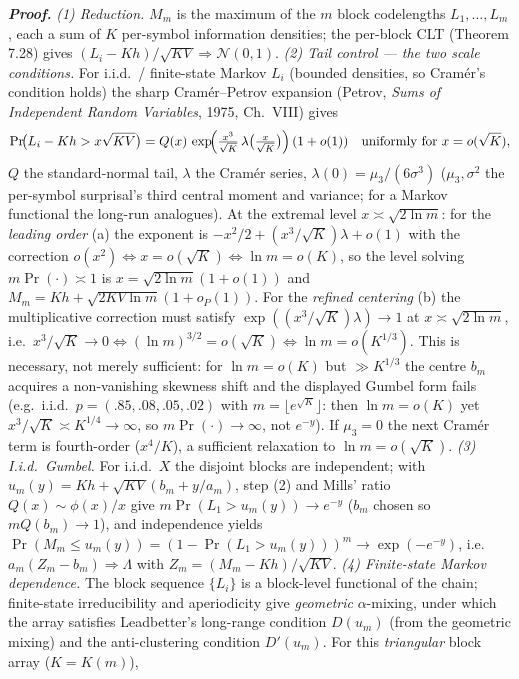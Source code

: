 \documentclass[
]{article}
\begin{document}
\emph{\textbf{Proof.}} \emph{(1) Reduction.} $M_m$ is the maximum of the $m$ block
codelengths $L_1,\dots,L_m$, each a sum of $K$ per-symbol information densities; the
per-block CLT (Theorem 7.28) gives $(L_i-Kh)/\sqrt{KV}\Rightarrow\mathcal N(0,1)$.
\emph{(2) Tail control --- the two scale conditions.} For i.i.d.\ / finite-state Markov
$L_i$ (bounded densities, so Cram\'er's condition holds) the sharp Cram\'er--Petrov
expansion (Petrov, \emph{Sums of Independent Random Variables}, 1975, Ch.~VIII) gives
\[
  \Pr\!\bigl(L_i-Kh>x\sqrt{KV}\bigr)=Q(x)\,\exp\!\Bigl(\tfrac{x^3}{\sqrt K}\,
  \lambda\bigl(\tfrac{x}{\sqrt K}\bigr)\Bigr)\,(1+o(1))\quad\text{uniformly for }x=o(\sqrt K),
\]
$Q$ the standard-normal tail, $\lambda$ the Cram\'er series, $\lambda(0)=\mu_3/(6\sigma^3)$
($\mu_3,\sigma^2$ the per-symbol surprisal's third central moment and variance; for a Markov
functional the long-run analogues). At the extremal level $x\asymp\sqrt{2\ln m}$: for the
\emph{leading order} (a) the exponent is $-x^2/2+(x^3/\sqrt K)\lambda+o(1)$ with the
correction $o(x^2)\iff x=o(\sqrt K)\iff\ln m=o(K)$, so the level solving $m\Pr(\cdot)\asymp1$
is $x=\sqrt{2\ln m}(1+o(1))$ and $M_m=Kh+\sqrt{2KV\ln m}(1+o_P(1))$. For the \emph{refined
centering} (b) the multiplicative correction must satisfy $\exp((x^3/\sqrt K)\lambda)\to1$ at
$x\asymp\sqrt{2\ln m}$, i.e.\ $x^3/\sqrt K\to0\iff(\ln m)^{3/2}=o(\sqrt K)\iff\ln m=o(K^{1/3})$.
This is necessary, not merely sufficient: for $\ln m=o(K)$ but $\gg K^{1/3}$ the centre
$b_m$ acquires a non-vanishing skewness shift and the displayed Gumbel form fails (e.g.\
i.i.d.\ $p=(.85,.08,.05,.02)$ with $m=\lfloor e^{\sqrt K}\rfloor$: then $\ln m=o(K)$ yet
$x^3/\sqrt K\asymp K^{1/4}\to\infty$, so $m\Pr(\cdot)\to\infty$, not $e^{-y}$). If $\mu_3=0$
the next Cram\'er term is fourth-order ($x^4/K$), a sufficient relaxation to $\ln m=o(\sqrt K)$.
\emph{(3) I.i.d.\ Gumbel.} For i.i.d.\ $X$ the disjoint blocks are independent; with
$u_m(y)=Kh+\sqrt{KV}(b_m+y/a_m)$, step (2) and Mills' ratio $Q(x)\sim\phi(x)/x$ give
$m\Pr(L_1>u_m(y))\to e^{-y}$ ($b_m$ chosen so $mQ(b_m)\to1$), and independence yields
$\Pr(M_m\le u_m(y))=(1-\Pr(L_1>u_m(y)))^m\to\exp(-e^{-y})$, i.e.\ $a_m(Z_m-b_m)\Rightarrow
\Lambda$ with $Z_m=(M_m-Kh)/\sqrt{KV}$. \emph{(4) Finite-state Markov dependence.} The block
sequence $\{L_i\}$ is a block-level functional of the chain; finite-state irreducibility and
aperiodicity give \emph{geometric} $\alpha$-mixing, under which the array satisfies
Leadbetter's long-range condition $D(u_m)$ (from the geometric mixing) and the
anti-clustering condition $D'(u_m)$. For this \emph{triangular} block array ($K=K(m)$),
\end{document}
